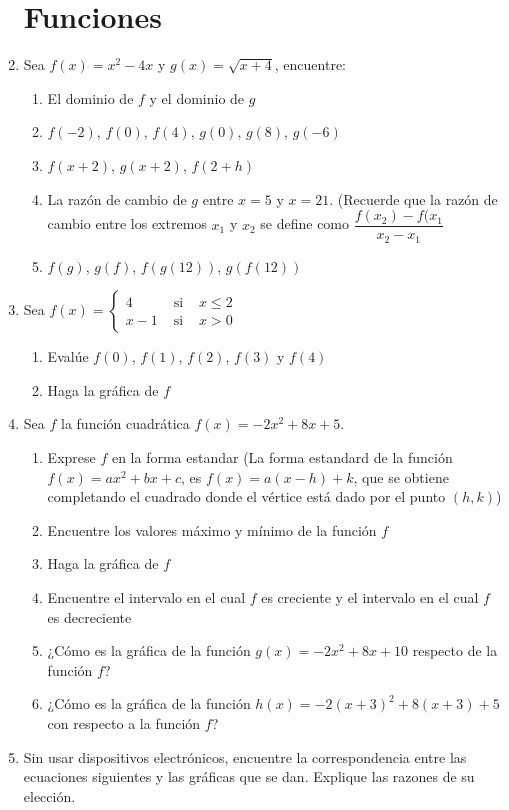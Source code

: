 \documentclass[10pt,twoside]{article}
\begin{document}
\begin{enumerate}
\section*{Funciones}
\item Sea $f(x)=x^{2}-4x$ y $g(x)=\sqrt{x+4}$, encuentre:
\begin{enumerate}
\item El dominio de $f$ y el dominio de $g$
\item $f(-2)$, $f(0)$, $f(4)$, $g(0)$, $g(8)$, $g(-6)$
\item $f(x+2)$, $g(x+2)$, $f(2+h)$
\item La razón de cambio de $g$ entre $x=5$ y $x=21$. (Recuerde que la razón de cambio entre los extremos $x_{1}$ y $x_{2}$ se define como $\dfrac{f(x_{2})-f(x_{1}}{x_{2}-x_{1}}$
\item $f(g)$, $g(f)$, $f(g(12))$, $g(f(12))$
\end{enumerate}
\item Sea 
$
f(x)= \left\{ \begin{array}{lcl}
4 & \mbox{ si } & x\leq 2 \\
x-1 & \mbox{ si } & x>0
\end{array}
\right.
$
\begin{enumerate}
\item Evalúe $f(0)$, $f(1)$, $f(2)$, $f(3)$ y $f(4)$
\item Haga la gráfica de $f$
\end{enumerate}
\item Sea $f$ la función cuadrática $f(x)=-2x^{2}+8x+5$.
\begin{enumerate}
\item Exprese $f$ en la forma estandar (La forma estandard de la función $f(x)=ax^{2}+bx+c$, es $f(x)=a(x-h)+k$, que se obtiene completando el cuadrado donde el vértice está dado por el punto $(h,k)$)
\item Encuentre los valores máximo y mínimo de la función $f$
\item Haga la gráfica de $f$
\item Encuentre el intervalo en el cual $f$ es creciente y el intervalo en el cual $f$ es decreciente
\item ¿Cómo es la gráfica de la función $g(x)=-2x^{2}+8x+10$ respecto de la función $f$?
\item ¿Cómo es la gráfica de la función $h(x)=-2(x+3)^{2}+8(x+3)+5$ con respecto a la función $f$?
\end{enumerate}
\item Sin usar dispositivos electrónicos, encuentre la correspondencia entre las ecuaciones siguientes y las gráficas que se dan. Explique las razones de su elección.

\end{enumerate}
\end{document}
